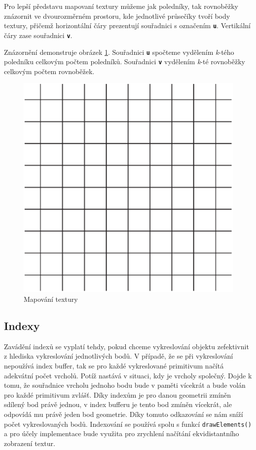 \newpage

Pro lepší představu mapovaní textury můžeme jak poledníky, tak rovnoběžky znázornit ve dvourozměrném prostoru, kde jednotlivé průsečíky tvoří body textury, přičemž horizontální čáry prezentují souřadnici s označením \texttt{\textbf{u}}. Vertikální čáry zase souřadnici \texttt{\textbf{v}}. 

Znázornění demonstruje obrázek \ref{img:grid}. Souřadnici \texttt{\textbf{u}} spočteme vydělením \textit{k}-tého poledníku celkovým počtem poledníků. Souřadnici \texttt{\textbf{v}} vydělením \textit{k}-té rovnoběžky celkovým počtem rovnoběžek.

\begin{figure}[h]
	\label{img:grid}
	\centering
	\includegraphics[scale=1.0,angle=0,width=0.4\linewidth]{obrazky-figures/grid}
	\caption{Mapování textury}
\end{figure}


\subsection{Indexy}
Zavádění indexů se vyplatí tehdy, pokud chceme vykreslování objektu zefektivnit z hlediska vykreslování jednotlivých bodů. V případě, že se při vykreslování nepoužívá index buffer, tak se pro každé vykreslované primitivum načítá adekvátní počet vrcholů. Potíž nastává v situaci, kdy je vrcholy společný. Dojde k tomu, že souřadnice vrcholu jednoho bodu bude v paměti vícekrát a bude volán pro každé primitivum zvlášť. Díky indexům je pro danou geometrii zmíněn sdílený bod právě jednou, v index bufferu je tento bod zmíněn vícekrát, ale odpovídá mu právě jeden bod geometrie. Díky tomuto odkazování se nám sníží počet vykreslovaných bodů. Indexování se používá spolu s funkcí \texttt{drawElements()} a pro účely implementace bude využita pro zrychlení načítání ekvidistantního zobrazení textur.

\newpage

